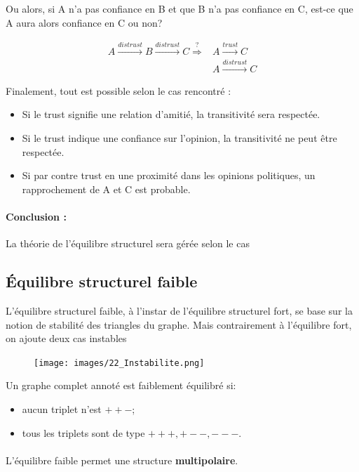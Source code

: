 Ou alors, si A n'a pas confiance en B et que B n'a pas confiance en C, est-ce que A aura alors confiance en C ou non?


\begin{align*}
A \overset{distrust}{\longrightarrow} B \overset{distrust}{\longrightarrow} C \overset{?}{\Longrightarrow} &A \overset{trust}{\longrightarrow} C\\
&A \overset{distrust}{\longrightarrow} C
\end{align*}

Finalement, tout est possible selon le cas rencontré : 
\begin{itemize}
\item Si le trust signifie une relation d'amitié, la transitivité sera respectée. 
\item Si le trust indique une confiance sur l’opinion, la transitivité ne peut être respectée. 
\item Si par contre trust en une proximité dans les opinions politiques, un rapprochement de A et C est probable. 
\end{itemize}


\paragraph{Conclusion :}La théorie de l'équilibre structurel sera gérée selon le cas




\subsection{Équilibre structurel faible}
L'équilibre structurel faible, à l'instar de l'équilibre structurel fort, se base sur la
notion de stabilité des triangles du graphe. Mais contrairement à l'équilibre fort, on ajoute deux cas instables   

\begin{figure}[!h]
	\centering
	\texttt{[image: images/22\_Instabilite.png]}
\end{figure}

Un graphe complet annoté est faiblement équilibré si:
\begin{itemize}
\item aucun triplet n'est $++-$;
\item tous les triplets sont de type $+++, +--, ---$. 
\end{itemize}
\paragraph{}
L'équilibre faible permet une structure \textbf{multipolaire}.


